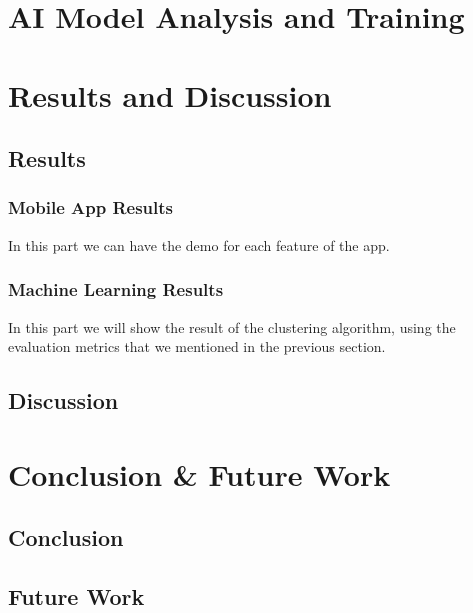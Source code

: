 \documentclass{article}
\makeatletter
\newcommand\subsubsubsection{\@startsection{paragraph}{4}{\z@}{-2.5ex\@plus -1ex \@minus -.25ex}{1.25ex \@plus .25ex}{\normalfont\normalsize\bfseries}}
\makeatother
\begin{document}

\section{AI Model Analysis and Training}

\section{Results and Discussion}
\subsection{Results}

\subsubsection{Mobile App Results}
In this part we can have the demo for each feature of the app.

\subsubsection{Machine Learning Results}
In this part we will show the result of the clustering algorithm, using the evaluation 
metrics that we mentioned in the previous section.

\subsection{Discussion}

\section{Conclusion {\&} Future Work}

\subsection{Conclusion}
\subsection{Future Work}
\end{document}

